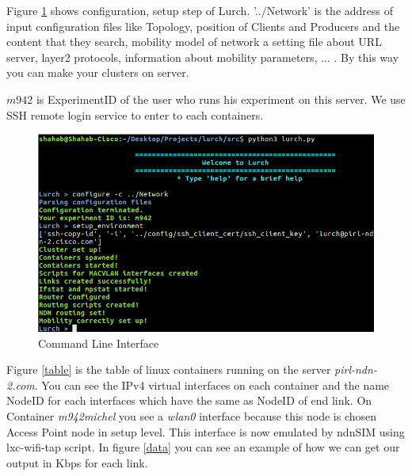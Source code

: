 Figure \ref{cli} shows configuration, setup step of Lurch.
'../Network' is the address of input configuration files like Topology, position of Clients and Producers and the content that they search, mobility model of network a setting file about URL server, layer2 protocols, information about mobility parameters, ... . By this way you can make your clusters on server.

$m942$ is ExperimentID of the user who runs his experiment on this server. We use SSH remote login service to enter to each containers.

\begin{figure}[H]

\begin{center}

\includegraphics[scale = 0.35]{Pictures/lurch.png}

\caption{Command Line Interface} \label{cli} 

\end{center}

\end{figure}

 
Figure \ref{table} is the table of linux containers running on the server \textit{pirl-ndn-2.com}. You can see the IPv4 virtual interfaces on each container and the name NodeID for each interfaces which have the same as NodeID of end link. On Container \textit{m942michel} you see a \textit{wlan0} interface because this node is chosen Access Point node in setup level. This interface is now emulated by ndnSIM using lxc-wifi-tap script. In figure \ref{data} you can see an example of how we can get our output in Kbps for each link.


